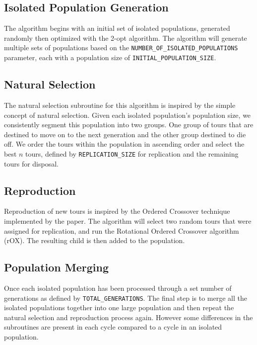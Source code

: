 \documentclass[12pt]{article}
\begin{document}
\subsection{Isolated Population Generation}

The algorithm begins with an initial set of isolated populations, generated randomly then optimized with the 2-opt algorithm. The algorithm will generate multiple sets of populations based on the \verb|NUMBER_OF_ISOLATED_POPULATIONS| parameter, each with a population size of \verb|INITIAL_POPULATION_SIZE|. 

\subsection{Natural Selection}

The natural selection subroutine for this algorithm is inspired by the simple concept of natural selection. Given each isolated population's population size, we consistently segment this population into two groups. One group of tours that are destined to move on to the next generation and the other group destined to die off. We order the tours within the population in ascending order and select the best $n$ tours, defined by \verb|REPLICATION_SIZE| for replication and the remaining tours for disposal. 

\subsection{Reproduction}

Reproduction of new tours is inspired by the Ordered Crossover technique implemented by the paper. The algorithm will select two random tours that were assigned for replication, and run the Rotational Ordered Crossover algorithm (rOX). The resulting child is then added to the population. 

\subsection{Population Merging}

Once each isolated population has been processed through a set number of generations as defined by \verb|TOTAL_GENERATIONS|. The final step is to merge all the isolated populations together into one large population and then repeat the natural selection and reproduction process again. However some differences in the subroutines are present in each cycle compared to a cycle in an isolated population.\\
\end{document}
